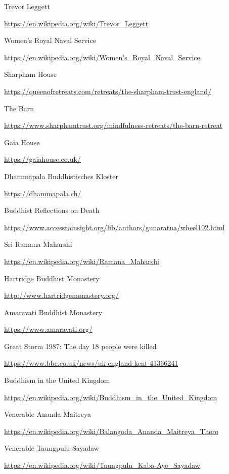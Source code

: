 \begin{thebibliography}{9}
 Trevor Leggett

  {\urlsize \url{https://en.wikipedia.org/wiki/Trevor_Leggett}}

 Women's Royal Naval Service

  {\urlsize \url{https://en.wikipedia.org/wiki/Women's_Royal_Naval_Service}}

 Sharpham House

  {\urlsize \url{https://queenofretreats.com/retreats/the-sharpham-trust-england/}}

 The Barn

  {\urlsize \url{https://www.sharphamtrust.org/mindfulness-retreats/the-barn-retreat}}

 Gaia House

  {\urlsize \url{https://gaiahouse.co.uk/}}

 Dhammapala Buddhistisches Kloster

  {\urlsize \url{https://dhammapala.ch/}}

 Buddhist Reflections on Death

  {\urlsize \url{https://www.accesstoinsight.org/lib/authors/gunaratna/wheel102.html}}

 Sri Ramana Maharshi

  {\urlsize \url{https://en.wikipedia.org/wiki/Ramana_Maharshi}}

 Hartridge Buddhist Monastery

  {\urlsize \url{http://www.hartridgemonastery.org/}}

 Amaravati Buddhist Monastery

  {\urlsize \url{https://www.amaravati.org/}}

 Great Storm 1987: The day 18 people were killed

  {\urlsize \url{https://www.bbc.co.uk/news/uk-england-kent-41366241}}

 Buddhism in the United Kingdom

  {\urlsize \url{https://en.wikipedia.org/wiki/Buddhism_in_the_United_Kingdom}}

 Venerable Ananda Maitreya

  {\urlsize \url{https://en.wikipedia.org/wiki/Balangoda_Ananda_Maitreya_Thero}}

 Venerable Taungpulu Sayadaw

  {\urlsize \url{https://en.wikipedia.org/wiki/Taungpulu_Kaba-Aye_Sayadaw}}


\end{thebibliography}
